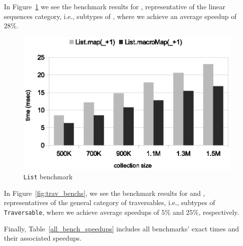 In Figure~\ref{fig:lin_bench} we see the benchmark results for ,
representative of the linear sequences category, i.e., subtypes of , where we achieve an average speedup of $28\%$.

\begin{figure}
\centering
\includegraphics[scale=0.7]{figures/list_bench.eps}
\caption[\texttt{List} benchmark]{\texttt{List} benchmark}
\label{fig:lin_bench}
\end{figure}

% 
% 


In Figure~\ref{fig:trav_benchs}, we see the benchmark results for
 and ,
representatives of the general category of traversables, i.e., subtypes of \texttt{Traversable}, where we achieve average speedups of $5\%$ and $25\%$, respectively.

Finally, Table~\ref{all_bench_speedups} includes all benchmarks' exact times and their associated speedups.

